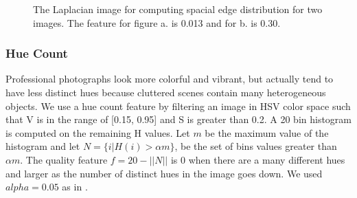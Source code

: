 \documentclass[conference,a4paper]{IEEEtran}
\begin{document}
\begin{figure}
  \centering
  \caption{
  The Laplacian image for computing spacial edge distribution for two images.  The feature for figure a. is 0.013 and for b. is 0.30.
  }
\end{figure}

  \subsubsection{Hue Count}
  Professional photographs look more colorful and vibrant, but actually tend to have less distinct hues because cluttered scenes contain many heterogeneous objects.  We use a hue count feature by filtering an image in HSV color space such that V is in the range of [0.15, 0.95] and S is greater than 0.2.  A 20 bin histogram is computed on the remaining H values.  Let $m$ be the maximum value of the histogram and let $N = \{i | H(i) > \alpha m\}$, be the set of bins values greater than $\alpha m$.  The quality feature $f = 20 - ||N||$ is 0 when there are a many different hues and larger as the number of distinct hues in the image goes down.  We used $alpha = 0.05$ as in \cite{ke2006design}.
\end{document}
